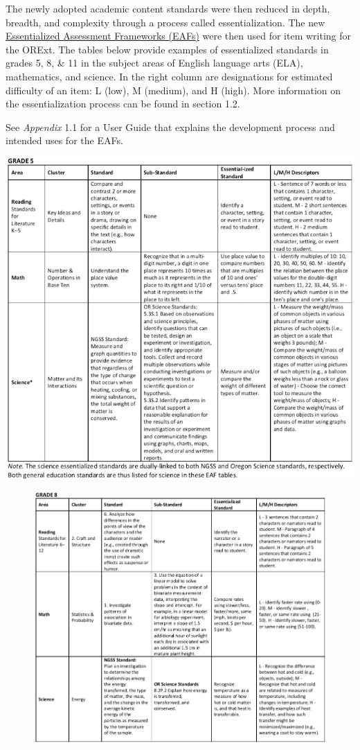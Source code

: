 \documentclass[]{article}
\begin{document}
The newly adopted academic content standards were then reduced in depth,
breadth, and complexity through a process called essentialization. The
new
\color{link}\href{http://www.brtprojects.org/publications/training-modules}{Essentialized
Assessment Frameworks (EAFs)} \color{black} were then used for item
writing for the ORExt. The tables below provide examples of
essentialized standards in grades 5, 8, \& 11 in the subject areas of
English language arts (ELA), mathematics, and science. In the right
column are designations for estimated difficulty of an item: L (low), M
(medium), and H (high). More information on the essentialization process
can be found in section 1.2.

See \emph{Appendix} 1.1 for a User Guide that explains the development
process and intended uses for the EAFs.

\FloatBarrier
\includegraphics{Figures/Standards/Grade5.png}

\begin{figure}
\centering
\includegraphics{Figures/Standards/Grade8.png}
\caption{}
\end{figure}
\end{document}
